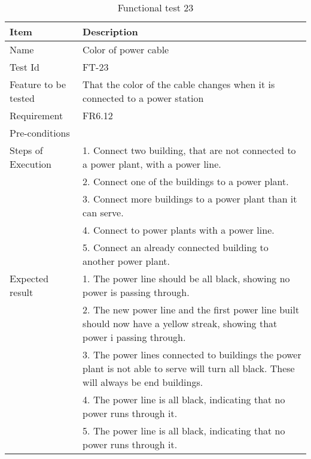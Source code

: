 \begin{table}[H]
\centering
	\begin{tabular}{ l | p{8cm} }
		\hline
		{\bf Item} & {\bf Description} \\ \hline
		Name &  Color of power cable \\ 
		Test Id & FT-23 \\ 
		Feature to be tested & That the color of the cable changes when it is connected to a power station \\ 
		Requirement & FR6.12 \\ 
		Pre-conditions &  \\ 
		Steps of Execution & 1. Connect two building, that are not connected to a power plant, with a power line. \\ 
		& 2. Connect one of the buildings to a power plant. \\
		& 3. Connect more buildings to a power plant than it can serve. \\
		& 4. Connect to power plants with a power line. \\
		& 5. Connect an already connected building to another power plant. \\
		Expected result & 1. The power line should be all black, showing no power is passing through. \\
		& 2. The new power line and the first power line built should now have a yellow streak, showing that power i passing through. \\
		& 3. The power lines connected to buildings the power plant is not able to serve will turn all black. These will always be end buildings. \\
		& 4. The power line is all black, indicating that no power runs through it. \\
		& 5. The power line is all black, indicating that no power runs through it. \\
	\end{tabular}
	\caption{Functional test 23}
\end{table}

